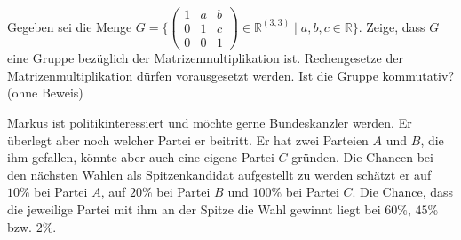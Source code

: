 \documentclass[10pt, a4paper]{exam}
\begin{document}
\begin{questions}
  \question

  \question Gegeben sei die Menge $G=\{ \begin{pmatrix} 1&a&b\\0&1&c\\0&0&1 \end{pmatrix} \in\mathbb{R}^{(3,3)}\mid a,b,c\in\mathbb{R}\}$. Zeige, dass $G$ eine Gruppe bezüglich der Matrizenmultiplikation ist. Rechengesetze der Matrizenmultiplikation dürfen vorausgesetzt werden. Ist die Gruppe kommutativ? (ohne Beweis)
  \begin{solution}
  \end{solution}

  \question Markus ist politikinteressiert und möchte gerne Bundeskanzler werden. Er überlegt aber noch welcher Partei er beitritt. Er hat zwei Parteien $A$ und $B$, die ihm gefallen, könnte aber auch eine eigene Partei $C$ gründen. Die Chancen bei den nächsten Wahlen als Spitzenkandidat aufgestellt zu werden schätzt er auf $10\%$ bei Partei $A$, auf $20\%$ bei Partei $B$ und $100\%$ bei Partei $C$. Die Chance, dass die jeweilige Partei mit ihm an der Spitze die Wahl gewinnt liegt bei $60\%$, $45\%$ bzw. $2\%$.
\end{questions}
\end{document}
